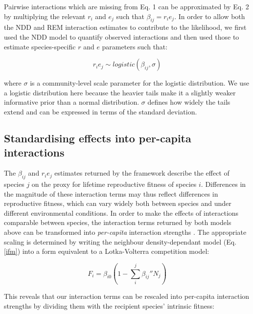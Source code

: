 \documentclass[a4,12pt]{article}
\begin{document}
        Pairwise interactions which are missing from Eq. 1 can be approximated by Eq. 2 by multiplying the relevant $r_{i}$ and $e_{j}$ such that $\beta_{ij} = r_{i} e_{j}$. In order to allow both the NDD and REM interaction estimates to contribute to the likelihood, we first used the NDD model to quantify observed interactions and then used those to estimate species-specific $r$ and $e$ parameters such that: 
    
        \begin{equation}
        r_i e_j \sim logistic \left ( \beta_{ij}, \sigma \right )
        \label{unrealised}
        \end{equation}
    
        where $\sigma$ is a community-level scale parameter for the logistic distribution. We use a logistic distribution here because the heavier tails make it a slightly weaker informative prior than a normal distribution. $\sigma$ defines how widely the tails extend and can be expressed in terms of the standard deviation. 

    \subsection{Standardising effects into per-capita interactions}

        The $\beta_{ij}$ and $r_i e_j$ estimates returned by the framework describe the effect of species $j$ on the proxy for lifetime reproductive fitness of species $i$. Differences in the magnitude of these interaction terms may thus reflect differences in reproductive fitness, which can vary widely both between species and under different environmental conditions. In order to make the effects of interactions comparable between species, the interaction terms returned by both models above can be transformed into \textit{per-capita} interaction strengths \parencite{Godoy2014, Bimler2018}. The appropriate scaling is determined by writing the neighbour density-dependant model (Eq. \ref{ifm}) into a form equivalent to a Lotka-Volterra competition model: 

        \begin{equation}
        F_{i} = \beta_{i0} \left ( 1 - \sum_{i}^{j} {\beta_{ij}}'' N_{j} \right )
        \label{LVform}
        \end{equation}

        This reveals that our interaction terms can be rescaled into per-capita interaction strengths by dividing them with the recipient species' intrinsic fitness:  
\end{document}
